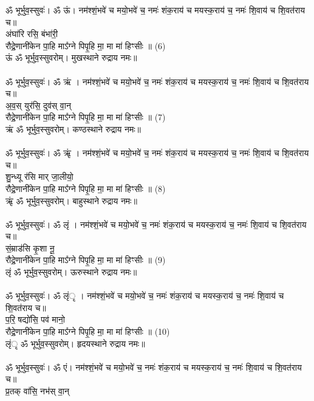 {\small ॐ भूर्भुव॒स्सुवः॑। ॐ ऊं। नम॑श्शं॒भवे॑ च मयो॒भवे॑ च॒ नमः॑ शंक॒राय॑ च मयस्क॒राय॑ च॒ नमः॑ शि॒वाय॑ च शि॒वत॑राय च॥}\\
अंघा॑रि रसि॒ बंभा॑री॒\\
रौद्रे॒णानी॑केन पा॒हि माऽ᳚ग्ने पिपृ॒हि मा॒ मा मा॑ हिꣳसीः ॥ (6)\\
{\small ऊं ॐ भूर्भुव॒स्सुवरोम्। मुखस्थाने रुद्राय नमः॥}\\
\\
{\small ॐ भूर्भुव॒स्सुवः॑। ॐ ऋं । नम॑श्शं॒भवे॑ च मयो॒भवे॑ च॒ नमः॑ शंक॒राय॑ च मयस्क॒राय॑ च॒ नमः॑ शि॒वाय॑ च शि॒वत॑राय च॥}\\
अ॒व॒स् युर॑सि॒ दुव॑स् वा॒न्\\
रौद्रे॒णानी॑केन पा॒हि माऽ᳚ग्ने पिपृ॒हि मा॒ मा मा॑ हिꣳसीः ॥ (7)\\
{\small ऋं ॐ भूर्भुव॒स्सुवरोम्। कण्ठस्थाने रुद्राय नमः॥}\\
\\
{\small ॐ भूर्भुव॒स्सुवः॑। ॐ ऋृं । नम॑श्शं॒भवे॑ च मयो॒भवे॑ च॒ नमः॑ शंक॒राय॑ च मयस्क॒राय॑ च॒ नमः॑ शि॒वाय॑ च शि॒वत॑राय च॥}\\
शु॒न्ध्यू र॑सि मार् जा॒लीयो॒\\
रौद्रे॒णानी॑केन पा॒हि माऽ᳚ग्ने पिपृ॒हि मा॒ मा मा॑ हिꣳसीः ॥ (8)\\
{\small ऋृं ॐ भूर्भुव॒स्सुवरोम्। बाहुस्थाने रुद्राय नमः॥}\\
\\
{\small ॐ भूर्भुव॒स्सुवः॑। ॐ लृं । नम॑श्शं॒भवे॑ च मयो॒भवे॑ च॒ नमः॑ शंक॒राय॑ च मयस्क॒राय॑ च॒ नमः॑ शि॒वाय॑ च शि॒वत॑राय च॥}\\
सं॒म्राड॑सि कृ॒शा नू॒\\
रौद्रे॒णानी॑केन पा॒हि माऽ᳚ग्ने पिपृ॒हि मा॒ मा मा॑ हिꣳसीः ॥ (9)\\
{\small लृं  ॐ भूर्भुव॒स्सुवरोम्। ऊरुस्थाने रुद्राय नमः॥}\\
\\
{\small ॐ भूर्भुव॒स्सुवः॑। ॐ लृंृ । नम॑श्शं॒भवे॑ च मयो॒भवे॑ च॒ नमः॑ शंक॒राय॑ च मयस्क॒राय॑ च॒ नमः॑ शि॒वाय॑ च शि॒वत॑राय च॥}\\
प॒रि॒ षद्यो॑सि॒ पव॑ मानो॒\\
रौद्रे॒णानी॑केन पा॒हि माऽ᳚ग्ने पिपृ॒हि मा॒ मा मा॑ हिꣳसीः ॥ (10)\\
{\small लृंृ  ॐ भूर्भुव॒स्सुवरोम्। हृदयस्थाने रुद्राय नमः॥}\\
\\
{\small ॐ भूर्भुव॒स्सुवः॑। ॐ एं। नम॑श्शं॒भवे॑ च मयो॒भवे॑ च॒ नमः॑ शंक॒राय॑ च मयस्क॒राय॑ च॒ नमः॑ शि॒वाय॑ च शि॒वत॑राय च॥}\\
प्र॒तक् वा॑सि॒ नभ॑स् वा॒न्\\
